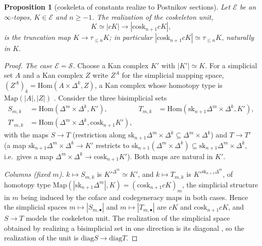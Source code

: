 \documentclass[11pt]{amsart}
\newtheorem{prop}[thm]{Proposition}
\theoremstyle{definition}
\newcommand{\Map}{\mathrm{Map}}
\newcommand{\Hom}{\mathrm{Hom}}
\newcommand{\cosk}{\mathrm{cosk}}
\newcommand{\sk}{\mathrm{sk}}
\newcommand{\sS}{\mathcal S}
\newcommand{\E}{\mathcal E}
\newcommand{\tr}[1]{\tau_{\le #1}}
\newcommand{\diag}{\mathrm{diag}}
\begin{document}
\begin{prop}[coskeleta of constants realize to Postnikov sections]\label{prop:const}
Let $\E$ be an $\infty$-topos, $K\in\E$ and $n\ge-1$. The realization of the
coskeleton unit,
\[
K\simeq|cK|\longrightarrow|\cosk_{n+1}cK|,
\]
is the truncation map $K\to\tr nK$; in particular $|\cosk_{n+1}cK|\simeq\tr nK$,
naturally in $K$.
\end{prop}
\begin{proof}
\emph{The case $\E=\sS$.} Choose a Kan complex $K'$ with $|K'|\simeq K$.
For a simplicial set $A$ and a Kan complex $Z$ write $Z^A$ for the simplicial
mapping space, $(Z^A)_k=\Hom(A\times\Delta^k,Z)$, a Kan complex whose
homotopy type is $\Map(|A|,|Z|)$ \cite[I.5, I.11]{GJ}. Consider the three
bisimplicial sets
\begin{align*}
S_{m,k}&=\Hom(\Delta^m\times\Delta^k,K'),&
T_{m,k}&=\Hom(\sk_{n+1}\Delta^m\times\Delta^k,K'),\\
T'_{m,k}&=\Hom(\Delta^m\times\Delta^k,\cosk_{n+1}K'),
\end{align*}
with the maps $S\to T$ (restriction along $\sk_{n+1}\Delta^m\times\Delta^k
\subseteq\Delta^m\times\Delta^k$) and $T\to T'$ (a map
$\sk_{n+1}\Delta^m\times\Delta^k\to K'$ restricts to
$\sk_{n+1}(\Delta^m\times\Delta^k)\subseteq\sk_{n+1}\Delta^m\times\Delta^k$, i.e.\ gives
a map $\Delta^m\times\Delta^k\to\cosk_{n+1}K'$). Both maps are natural in
$K'$.

\emph{Columns (fixed $m$).} $k\mapsto S_{m,k}$ is $K'^{\Delta^m}\simeq K'$, and
$k\mapsto T_{m,k}$ is $K'^{\sk_{n+1}\Delta^m}$, of homotopy type
$\Map(|\sk_{n+1}\Delta^m|,K)=(\cosk_{n+1}cK)_m$, the simplicial structure in
$m$ being induced by the coface and codegeneracy maps in both cases. Hence the
simplicial spaces $m\mapsto|S_{m,\bullet}|$ and $m\mapsto|T_{m,\bullet}|$ are
$cK$ and $\cosk_{n+1}cK$, and $S\to T$ models the coskeleton unit. The
realization of the simplicial space obtained by realizing a bisimplicial set
in one direction is its diagonal \cite[IV.1.7 and IV.1.9]{GJ}, so the
realization of the unit is $\diag S\to\diag T$.


\end{proof}
\end{document}
